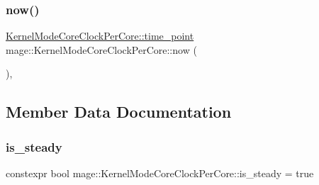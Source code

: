 \subsubsection{\texorpdfstring{now()}{now()}}
{\footnotesize\ttfamily \hyperlink{structmage_1_1_kernel_mode_core_clock_per_core_a26d0fe6b051dab6987956f52414659cc}{Kernel\+Mode\+Core\+Clock\+Per\+Core\+::time\+\_\+point} mage\+::\+Kernel\+Mode\+Core\+Clock\+Per\+Core\+::now (\begin{DoxyParamCaption}{ }\end{DoxyParamCaption})\hspace{0.3cm}{\ttfamily [static]}, {\ttfamily [noexcept]}}



\subsection{Member Data Documentation}
\hypertarget{structmage_1_1_kernel_mode_core_clock_per_core_a8b87465ab1497015a4f6436fd4637645}{}\label{structmage_1_1_kernel_mode_core_clock_per_core_a8b87465ab1497015a4f6436fd4637645} 
\subsubsection{\texorpdfstring{is\+\_\+steady}{is\_steady}}
{\footnotesize\ttfamily constexpr bool mage\+::\+Kernel\+Mode\+Core\+Clock\+Per\+Core\+::is\+\_\+steady = true\hspace{0.3cm}{\ttfamily [static]}}

